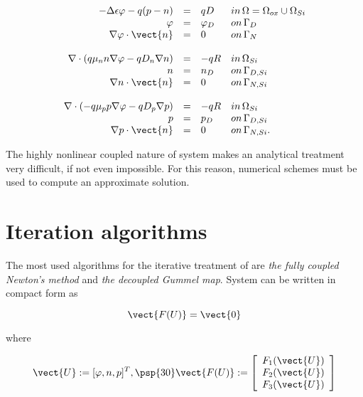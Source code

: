 \begin{equation}
\label{eq: system closed}
\begin{array}{rcll}
- \Delta \epsilon \varphi - q(p-n) & =  & qD & in \, \Omega = \Omega_{ox} \cup \Omega_{Si}\\
\varphi & = & \varphi_D & on \, \Gamma_D \\
\nabla \varphi \cdot \vect{n} & = & 0 & on \, \Gamma_N 
\\
\\
\nabla \cdot ( q\mu_n n \nabla \varphi - qD_n \nabla n ) & = & - qR & in \, \Omega_{Si}\\
n & = & n_D & on \, \Gamma_{D,Si} \\
\nabla n \cdot \vect{n} & = & 0 & on \, \Gamma_{N,Si}
\\
\\
\nabla \cdot (- q\mu_p p \nabla \varphi - qD_p \nabla p )& = & -qR& in \, \Omega_{Si}\\
p & = & p_D & on \, \Gamma_{D,Si} \\
\nabla p \cdot \vect{n} & = & 0 & on \, \Gamma_{N,Si}.
\end{array}
\end{equation}

The highly nonlinear coupled nature of system	 makes an analytical treatment very difficult, if not even impossible. For this reason, numerical schemes must be used to  compute an approximate solution. 


\section{Iteration algorithms}

 The most used algorithms for the iterative treatment of  are \textit{the fully coupled Newton's method} and \textit{the decoupled Gummel map}. System  can be written in compact form as

\begin{equation}
\label{eq: abstract problem fully}
\vect{F(U)}=\vect{0}
\end{equation}

where

\begin{equation}
\label{eq: functional operator}
\vect{U}:=[\varphi,n,p]^T, \psp{30} \vect{F(U)}:=\left[ \begin{array}{c}
F_1(\vect{U}) \\
F_2(\vect{U}) \\
F_3(\vect{U})
\end{array}
\right]
\end{equation}

